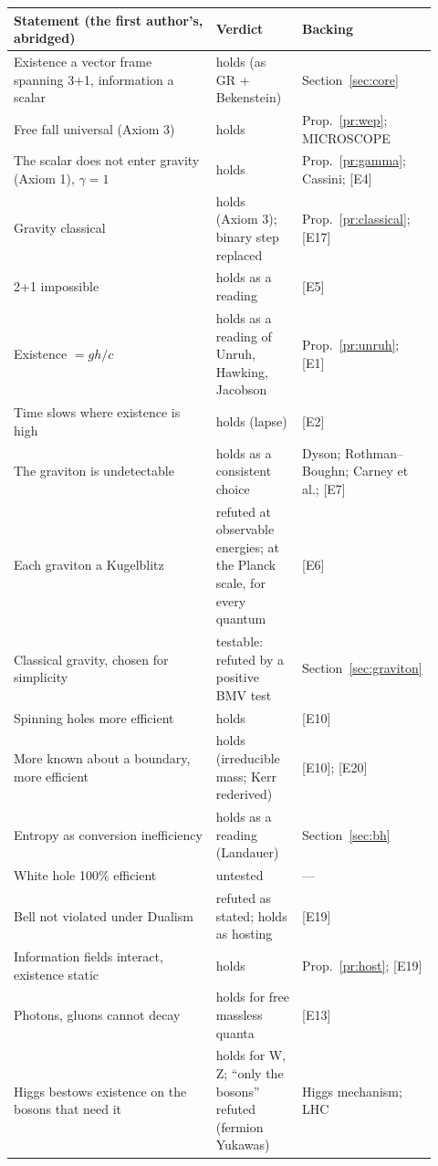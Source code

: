 \documentclass[11pt,a4paper]{article}
\theoremstyle{definition}
\theoremstyle{remark}
\newcommand{\chk}[1]{\textsf{[#1]}}
\begin{document}
\begin{center}\small
\begin{longtable}{@{}p{0.47\linewidth}p{0.2\linewidth}p{0.25\linewidth}@{}}
\toprule
Statement (the first author's, abridged) & Verdict & Backing \\
\midrule
\endhead
Existence a vector frame spanning 3+1, information a scalar & holds (as GR + Bekenstein) & Section~\ref{sec:core} \\
Free fall universal (Axiom 3) & holds & Prop.~\ref{pr:wep}; MICROSCOPE \\
The scalar does not enter gravity (Axiom 1), $\gamma=1$ & holds & Prop.~\ref{pr:gamma}; Cassini; \chk{E4} \\
Gravity classical & holds (Axiom 3); binary step replaced & Prop.~\ref{pr:classical}; \chk{E17} \\
2+1 impossible & holds as a reading & \chk{E5} \\
Existence $=gh/c$ & holds as a reading of Unruh, Hawking, Jacobson & Prop.~\ref{pr:unruh}; \chk{E1} \\
Time slows where existence is high & holds (lapse) & \chk{E2} \\
The graviton is undetectable & holds as a consistent choice & Dyson; Rothman--Boughn; Carney et al.; \chk{E7} \\
Each graviton a Kugelblitz & refuted at observable energies; at the Planck scale, for every quantum & \chk{E6} \\
Classical gravity, chosen for simplicity & testable: refuted by a positive BMV test & Section~\ref{sec:graviton} \\
Spinning holes more efficient & holds & \chk{E10} \\
More known about a boundary, more efficient & holds (irreducible mass; Kerr rederived) & \chk{E10}; \chk{E20} \\
Entropy as conversion inefficiency & holds as a reading (Landauer) & Section~\ref{sec:bh} \\
White hole 100\% efficient & untested & --- \\
Bell not violated under Dualism & refuted as stated; holds as hosting & \chk{E19} \\
Information fields interact, existence static & holds & Prop.~\ref{pr:host}; \chk{E19} \\
Photons, gluons cannot decay & holds for free massless quanta & \chk{E13} \\
Higgs bestows existence on the bosons that need it & holds for W, Z; ``only the bosons'' refuted (fermion Yukawas) & Higgs mechanism; LHC \\

\end{longtable}
\end{center}
\end{document}
